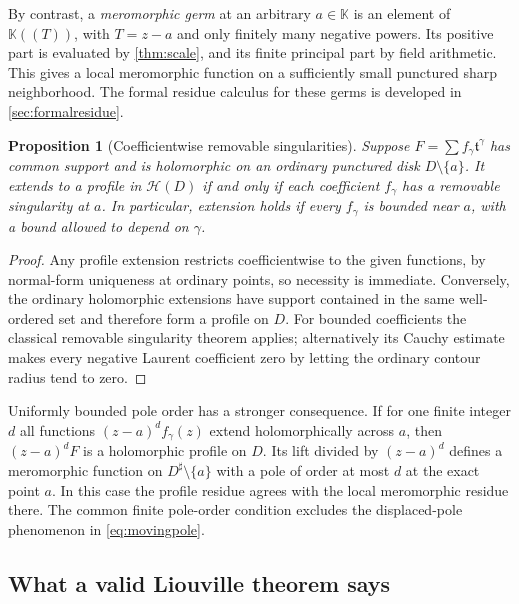 \documentclass[11pt,a4paper]{article}
\numberwithin{equation}{section}
\newtheorem{proposition}[theorem]{Proposition}
\theoremstyle{definition}
\newcommand{\K}{\mathbb K}
\newcommand{\tmon}{\mathfrak t}
\newcommand{\HH}{\mathscr H}
\begin{document}
By contrast, a \emph{meromorphic germ} at an arbitrary $a\in\K$ is an element
of $\K((T))$, with $T=z-a$ and only finitely many negative powers. Its positive
part is evaluated by \cref{thm:scale}, and its finite principal part by field
arithmetic. This gives a local meromorphic function on a sufficiently small
punctured sharp neighborhood. The formal residue calculus for these germs
is developed in \cref{sec:formalresidue}.

\begin{proposition}[Coefficientwise removable singularities]\label{prop:removal}
Suppose $F=\sum f_\gamma\tmon^\gamma$ has common support and is holomorphic
on an ordinary punctured disk $D\setminus\{a\}$. It extends to a profile in
$\HH(D)$ if and only if each coefficient $f_\gamma$ has a removable singularity
at $a$. In particular, extension holds if every $f_\gamma$ is bounded near $a$,
with a bound allowed to depend on $\gamma$.
\end{proposition}
\begin{proof}
Any profile extension restricts coefficientwise to the given functions,
by normal-form uniqueness at ordinary points, so necessity is immediate.
Conversely, the ordinary holomorphic extensions have support contained in
the same well-ordered set and therefore form a profile on $D$.
For bounded coefficients the classical removable singularity theorem applies;
alternatively its Cauchy estimate makes every negative Laurent coefficient
zero by letting the ordinary contour radius tend to zero.
\end{proof}

Uniformly bounded pole order has a stronger consequence. If for one finite
integer $d$ all functions $(z-a)^d f_\gamma(z)$ extend holomorphically across
$a$, then $(z-a)^dF$ is a holomorphic profile on $D$. Its lift divided by
$(z-a)^d$ defines a meromorphic function on $D^\sharp\setminus\{a\}$ with a
pole of order at most $d$ at the exact point $a$. In this case the profile
residue agrees with the local meromorphic residue there. The common finite
pole-order condition excludes the displaced-pole phenomenon in
\eqref{eq:movingpole}.

\subsection{What a valid Liouville theorem says}
\end{document}
